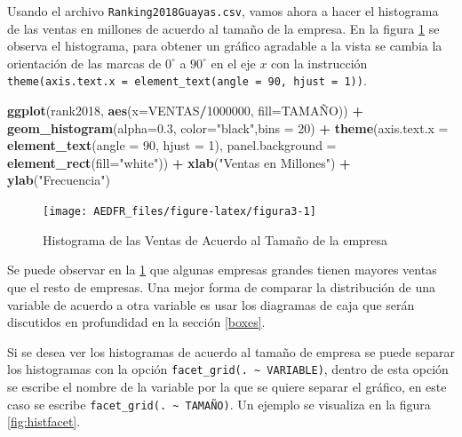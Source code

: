 \documentclass[letterpaper,]{book}
\newenvironment{Shaded}{\begin{snugshade}}{\end{snugshade}}
\newcommand{\DataTypeTok}[1]{\textcolor[rgb]{0.13,0.29,0.53}{#1}}
\newcommand{\DecValTok}[1]{\textcolor[rgb]{0.00,0.00,0.81}{#1}}
\newcommand{\FloatTok}[1]{\textcolor[rgb]{0.00,0.00,0.81}{#1}}
\newcommand{\KeywordTok}[1]{\textcolor[rgb]{0.13,0.29,0.53}{\textbf{#1}}}
\newcommand{\NormalTok}[1]{#1}
\newcommand{\OperatorTok}[1]{\textcolor[rgb]{0.81,0.36,0.00}{\textbf{#1}}}
\newcommand{\StringTok}[1]{\textcolor[rgb]{0.31,0.60,0.02}{#1}}
\begin{document}
Usando el archivo \texttt{Ranking2018Guayas.csv}, vamos ahora a hacer el histograma de las ventas en millones de acuerdo al tamaño de la empresa. En la figura \ref{fig:figura3} se observa el histograma, para obtener un gráfico agradable a la vista se cambia la orientación de las marcas de \(0^\circ\) a \(90^\circ\) en el eje \(x\) con la instrucción \texttt{theme(axis.text.x\ =\ element\_text(angle\ =\ 90,\ hjust\ =\ 1))}.

\begin{Shaded}
\begin{Highlighting}[]
\KeywordTok{ggplot}\NormalTok{(rank2018, }\KeywordTok{aes}\NormalTok{(}\DataTypeTok{x=}\NormalTok{VENTAS}\OperatorTok{/}\DecValTok{1000000}\NormalTok{, }\DataTypeTok{fill=}\NormalTok{TAMAÑO)) }\OperatorTok{+}\StringTok{ }
\StringTok{  }\KeywordTok{geom_histogram}\NormalTok{(}\DataTypeTok{alpha=}\FloatTok{0.3}\NormalTok{, }\DataTypeTok{color=}\StringTok{"black"}\NormalTok{,}\DataTypeTok{bins =} \DecValTok{20}\NormalTok{) }\OperatorTok{+}
\StringTok{  }\KeywordTok{theme}\NormalTok{(}\DataTypeTok{axis.text.x =} \KeywordTok{element_text}\NormalTok{(}\DataTypeTok{angle =} \DecValTok{90}\NormalTok{, }\DataTypeTok{hjust =} \DecValTok{1}\NormalTok{), }
        \DataTypeTok{panel.background =} \KeywordTok{element_rect}\NormalTok{(}\DataTypeTok{fill=}\StringTok{"white"}\NormalTok{)) }\OperatorTok{+}
\StringTok{  }\KeywordTok{xlab}\NormalTok{(}\StringTok{"Ventas en Millones"}\NormalTok{) }\OperatorTok{+}\StringTok{ }\KeywordTok{ylab}\NormalTok{(}\StringTok{"Frecuencia"}\NormalTok{) }
\end{Highlighting}
\end{Shaded}

\begin{figure}[h!]

{\centering \texttt{[image: AEDFR\_files/figure-latex/figura3-1]} 

}

\caption{Histograma de las Ventas de Acuerdo al Tamaño de la empresa}\label{fig:figura3}
\end{figure}

Se puede observar en la \ref{fig:figura3} que algunas empresas grandes tienen mayores ventas que el resto de empresas. Una mejor forma de comparar la distribución de una variable de acuerdo a otra variable es usar los diagramas de caja que serán discutidos en profundidad en la sección \ref{boxes}.

Si se desea ver los histogramas de acuerdo al tamaño de empresa se puede separar los histogramas con la opción \texttt{facet\_grid(.\ \textasciitilde{}\ VARIABLE)}, dentro de esta opción se escribe el nombre de la variable por la que se quiere separar el gráfico, en este caso se escribe \texttt{facet\_grid(.\ \textasciitilde{}\ TAMAÑO)}. Un ejemplo se visualiza en la figura \ref{fig:histfacet}.
\end{document}
